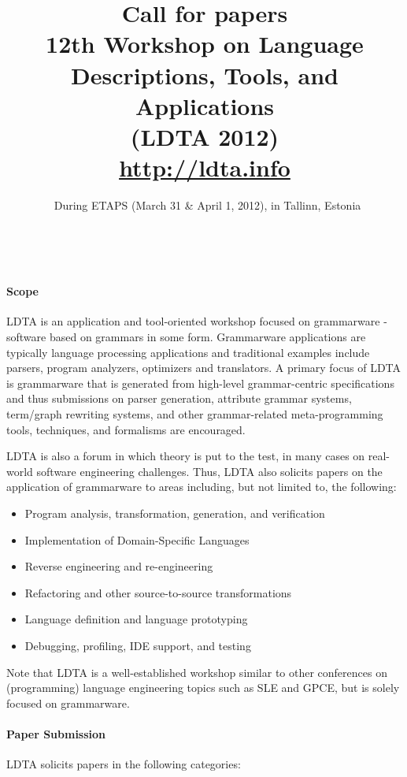 \documentclass[letterpaper, twocolumn, 9pt]{article}
\title{\Large\textbf{\textsf{Call for papers \\
12th Workshop on Language Descriptions, Tools, and Applications \\
(LDTA 2012)\\
{\large\url{http://ldta.info}}}}}
\author{~\vspace{-0.4in}\large{During ETAPS (March 31 \& April 1, 2012), in Tallinn, Estonia}}
\date{~\vspace{-0.4in}}
\begin{document}
\maketitle
\thispagestyle{empty}

\paragraph{\textsf{Scope}}

LDTA is an application and tool-oriented workshop focused on
grammarware - software based on grammars in some form. Grammarware
applications are typically language processing applications and
traditional examples include parsers, program analyzers, optimizers
and translators. A primary focus of LDTA is grammarware that is
generated from high-level grammar-centric specifications and thus
submissions on parser generation, attribute grammar systems,
term/graph rewriting systems, and other grammar-related
meta-programming tools, techniques, and formalisms are encouraged.

LDTA is also a forum in which theory is put to the test, in many cases
on real-world software engineering challenges. Thus, LDTA also
solicits papers on the application of grammarware to areas including,
but not limited to, the following:
\begin{itemize}
\item Program analysis, transformation, generation, and verification
\item Implementation of Domain-Specific Languages
\item Reverse engineering and re-engineering
\item Refactoring and other source-to-source transformations
\item Language definition and language prototyping
\item Debugging, profiling, IDE support, and testing
\end{itemize}

Note that LDTA is a well-established workshop similar to other
conferences on (programming)
language engineering topics such as SLE and GPCE, but is solely focused on grammarware.

\paragraph{\textsf{Paper Submission}}
LDTA solicits papers in the following categories:
\end{document}

